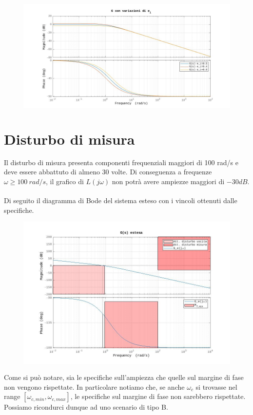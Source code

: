 \documentclass[a4paper,12pt,italian]{article}
\begin{document}
\begin{figure}[h!]
    \begin{center}
        \includegraphics[scale=0.5]{img/bode_GG_ei.jpg}
    \end{center}    
\end{figure}

\newpage

\section{Disturbo di misura}

Il disturbo di misura presenta componenti frequenziali maggiori di 100 rad/s e deve essere abbattuto di almeno 30 volte.
Di conseguenza a frequenze $\omega \geq 100~rad/s$, il grafico di $L(j\omega)$ non potrà avere ampiezze maggiori di $-30dB$.\\ \\
Di seguito il diagramma di Bode del sistema esteso con i vincoli ottenuti dalle specifiche.

\begin{figure}[h!]
    \begin{center}
        \includegraphics[scale=0.5]{img/bode_GG_estesa.jpg}
    \end{center}    
\end{figure}
Come si può notare, sia le specifiche sull'ampiezza che quelle sul margine di fase non vengono rispettate.
In particolare notiamo che, se anche $\omega_c$ si trovasse nel range $[\omega_{c,min}, \omega_{c,max}]$,
le specifiche sul margine di fase non sarebbero rispettate.
Possiamo ricondurci dunque ad uno scenario di tipo B.
\end{document}
